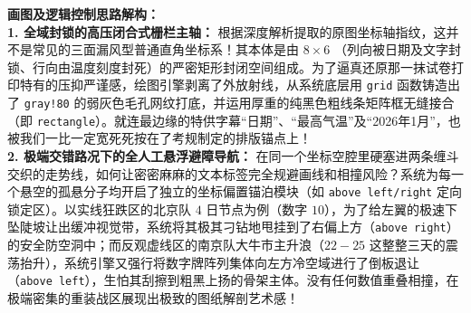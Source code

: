 \begin{center}
\end{center}

\vspace{0.4cm}
{\small\color{blue!70!black}
\textbf{画图及逻辑控制思路解构：}\\
\textbf{1. 全域封锁的高压闭合式栅栏主轴：} 根据深度解析提取的原图坐标轴指纹，这并不是常见的三面漏风型普通直角坐标系！其本体是由 $8 \times 6$ （列向被日期及文字封锁、行向由温度刻度封死）的严密矩形封闭空间组成。为了逼真还原那一抹试卷打印特有的压抑严谨感，绘图引擎剥离了外放射线，从系统底层用 \texttt{grid} 函数铸造出了 \texttt{gray!80} 的弱灰色毛孔网纹打底，并运用厚重的纯黑色粗线条矩阵框无缝接合（即 \texttt{rectangle}）。就连最边缘的特供字幕“日期”、“最高气温”及“2026年1月”，也被我们一比一定宽死死按在了考规制定的排版锚点上！\\
\textbf{2. 极端交错路况下的全人工悬浮避障导航：} 在同一个坐标空腔里硬塞进两条缠斗交织的走势线，如何让密密麻麻的文本标签完全规避画线和相撞风险？系统为每一个悬空的孤悬分子均开启了独立的坐标偏置锚泊模块（如 \texttt{above left/right} 定向锁定区）。以实线狂跌区的北京队 $4$ 日节点为例（数字 $10$），为了给左翼的极速下坠陡坡让出缓冲视觉带，系统将其极其刁钻地甩挂到了右偏上方（\texttt{above right}）的安全防空洞中；而反观虚线区的南京队大牛市主升浪（$22-25$ 这整整三天的震荡抬升），系统引擎又强行将数字牌阵列集体向左方冷空域进行了倒板退让（\texttt{above left}），生怕其刮擦到粗黑上扬的骨架主体。没有任何数值重叠相撞，在极端密集的重装战区展现出极致的图纸解剖艺术感！
}

